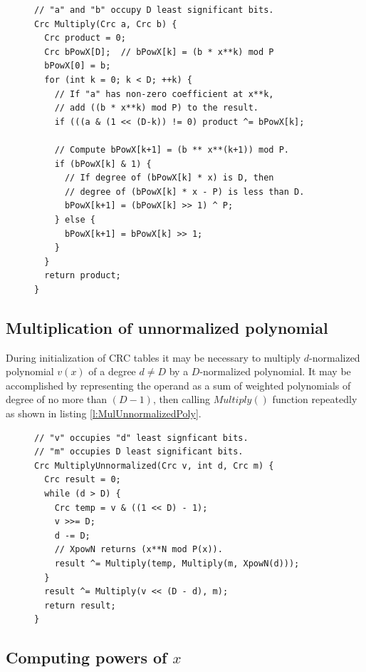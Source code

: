\documentclass{article}
\begin{document}
\begin{figure}
\begin{lstlisting}[caption={Multiplication of normalized polynomials},label={l:MulNormalizedPoly}]
// "a" and "b" occupy D least significant bits.
Crc Multiply(Crc a, Crc b) {
  Crc product = 0;
  Crc bPowX[D];  // bPowX[k] = (b * x**k) mod P
  bPowX[0] = b;
  for (int k = 0; k < D; ++k) {
    // If "a" has non-zero coefficient at x**k,
    // add ((b * x**k) mod P) to the result.
    if (((a & (1 << (D-k)) != 0) product ^= bPowX[k];

    // Compute bPowX[k+1] = (b ** x**(k+1)) mod P.
    if (bPowX[k] & 1) {
      // If degree of (bPowX[k] * x) is D, then
      // degree of (bPowX[k] * x - P) is less than D.
      bPowX[k+1] = (bPowX[k] >> 1) ^ P;
    } else {
      bPowX[k+1] = bPowX[k] >> 1;
    }
  }
  return product;
}
\end{lstlisting}
\end{figure}

\subsection{Multiplication of unnormalized polynomial}

During initialization of CRC tables it may be necessary to multiply
$d$-normalized polynomial $v(x)$ of a degree $d \neq D$ by a $D$-normalized
polynomial. It may be accomplished by representing the operand as a sum of
weighted polynomials of degree of no more than $(D-1)$, then calling
$Multiply()$ function repeatedly as shown in listing
\ref{l:MulUnnormalizedPoly}.

\begin{figure}
\begin{lstlisting}[caption={Multiplication of unnormalized polynomial},label={l:MulUnnormalizedPoly}]
// "v" occupies "d" least signficant bits.
// "m" occupies D least significant bits.
Crc MultiplyUnnormalized(Crc v, int d, Crc m) {
  Crc result = 0;
  while (d > D) {
    Crc temp = v & ((1 << D) - 1);
    v >>= D;
    d -= D;
    // XpowN returns (x**N mod P(x)).
    result ^= Multiply(temp, Multiply(m, XpowN(d)));
  }
  result ^= Multiply(v << (D - d), m);
  return result;
}
\end{lstlisting}
\end{figure}


\subsection{Computing powers of $x$} \label{s:mulpown}
\end{document}
